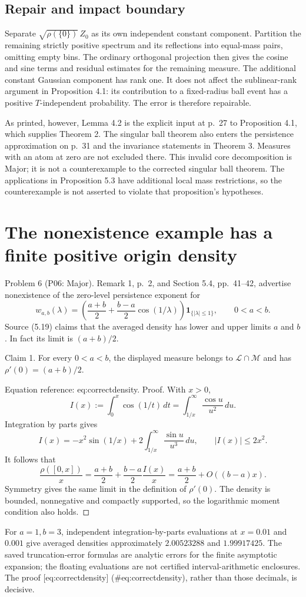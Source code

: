 \documentclass[10pt]{article}
\begin{document}
\subsection*{Repair and impact boundary}
Separate \(\sqrt{\rho(\{0\})}\,Z_0\) as its own independent constant component. Partition the remaining strictly positive spectrum and its reflections into equal-mass pairs, omitting empty bins. The ordinary orthogonal projection then gives the cosine and sine terms and residual estimates for the remaining measure. The additional constant Gaussian component has rank one. It does not affect the sublinear-rank argument in Proposition 4.1: its contribution to a fixed-radius ball event has a positive \(T\)-independent probability. The error is therefore repairable.\par
As printed, however, Lemma 4.2 is the explicit input at p. 27 to Proposition 4.1, which supplies Theorem 2. The singular ball theorem also enters the persistence approximation on p. 31 and the invariance statements in Theorem 3. Measures with an atom at zero are not excluded there. This invalid core decomposition is Major; it is not a counterexample to the corrected singular ball theorem. The applications in Proposition 5.3 have additional local mass restrictions, so the counterexample is not asserted to violate that proposition’s hypotheses.\par
\section*{The nonexistence example has a finite positive origin density}
Problem 6 (P06: Major).  Remark 1, p. 2, and Section 5.4, pp. 41–42, advertise nonexistence of the zero-level persistence exponent for \[w_{a,b}(\lambda)=
 \left(\frac{a+b}{2}+\frac{b-a}{2}\cos(1/\lambda)\right)
 \mathbf 1_{\{|\lambda|\le1\}},\qquad 0<a<b.\] Source (5.19) claims that the averaged density has lower and upper limits \(a\) and \(b\). In fact its limit is \((a+b)/2\).\par
Claim 1.  For every \(0<a<b\), the displayed measure belongs to \(\mathcal L\cap\mathcal M\) and has \(\rho'(0)=(a+b)/2\).\par
Equation reference: eq:correctdensity. Proof. With \(x>0\), \[I(x):=\int_0^x\cos(1/t)\,dt
      =\int_{1/x}^{\infty}\frac{\cos u}{u^2}\,du.\] Integration by parts gives \[I(x)=-x^2\sin(1/x)
       +2\int_{1/x}^{\infty}\frac{\sin u}{u^3}\,du,
 \qquad |I(x)|\le2x^2.\] It follows that \[\frac{\rho([0,x])}{x}
   =\frac{a+b}{2}+\frac{b-a}{2}\frac{I(x)}x
   =\frac{a+b}{2}+O((b-a)x).
 \] Symmetry gives the same limit in the definition of \(\rho'(0)\). The density is bounded, nonnegative and compactly supported, so the logarithmic moment condition also holds. ◻\par
For \(a=1,b=3\), independent integration-by-parts evaluations at \(x=0.01\) and \(0.001\) give averaged densities approximately \(2.00523288\) and \(1.99917425\). The saved truncation-error formulas are analytic errors for the finite asymptotic expansion; the floating evaluations are not certified interval-arithmetic enclosures. The proof [eq:correctdensity] (\#eq:correctdensity), rather than those decimals, is decisive.\par
\end{document}
